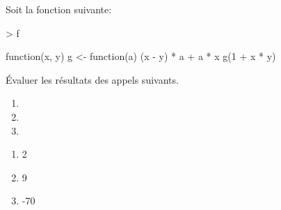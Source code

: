 \begin{exercice}
  Soit la fonction  suivante:
\begin{Schunk}
\begin{Sinput}
> f
\end{Sinput}
\begin{Soutput}
function(x, y)
{
    g <- function(a)
        (x - y) * a + a * x
    g(1 + x * y)
}
\end{Soutput}
\end{Schunk}
  Évaluer les résultats des appels suivants.
  \begin{enumerate}
  \item {}
  \item {}
  \item {}
  \end{enumerate}
  \begin{sol}
    \begin{enumerate}
    \item
\begin{Schunk}
\begin{Soutput}
[1] 2
\end{Soutput}
\end{Schunk}
    \item
\begin{Schunk}
\begin{Soutput}
[1] 9
\end{Soutput}
\end{Schunk}
    \item
\begin{Schunk}
\begin{Soutput}
[1] -70
\end{Soutput}
\end{Schunk}
    \end{enumerate}
  \end{sol}
\end{exercice}

